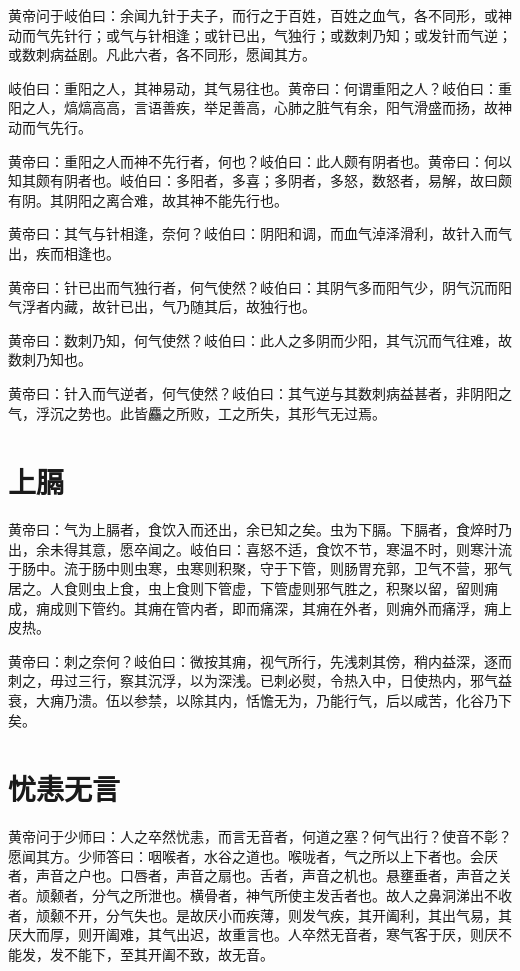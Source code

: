 \documentclass[a4paper,12pt,UTF8,twoside]{ctexbook}
\begin{document}
	黄帝问于岐伯曰：余闻九针于夫子，而行之于百姓，百姓之血气，各不同形，或神动而气先针行；或气与针相逢；或针已出，气独行；或数刺乃知；或发针而气逆；或数刺病益剧。凡此六者，各不同形，愿闻其方。
	
	岐伯曰：重阳之人，其神易动，其气易往也。黄帝曰：何谓重阳之人？岐伯曰：重阳之人，熇熇高高，言语善疾，举足善高，心肺之脏气有余，阳气滑盛而扬，故神动而气先行。
	
	黄帝曰：重阳之人而神不先行者，何也？岐伯曰：此人颇有阴者也。黄帝曰：何以知其颇有阴者也。岐伯曰：多阳者，多喜；多阴者，多怒，数怒者，易解，故曰颇有阴。其阴阳之离合难，故其神不能先行也。
	
	黄帝曰：其气与针相逢，奈何？岐伯曰：阴阳和调，而血气淖泽滑利，故针入而气出，疾而相逢也。
	
	黄帝曰：针已出而气独行者，何气使然？岐伯曰：其阴气多而阳气少，阴气沉而阳气浮者内藏，故针已出，气乃随其后，故独行也。
	
	黄帝曰：数刺乃知，何气使然？岐伯曰：此人之多阴而少阳，其气沉而气往难，故数刺乃知也。
	
	黄帝曰：针入而气逆者，何气使然？岐伯曰：其气逆与其数刺病益甚者，非阴阳之气，浮沉之势也。此皆麤之所败，工之所失，其形气无过焉。
	
	\chapter{上膈}
		
	黄帝曰：气为上膈者，食饮入而还出，余已知之矣。虫为下膈。下膈者，食焠时乃出，余未得其意，愿卒闻之。岐伯曰：喜怒不适，食饮不节，寒温不时，则寒汁流于肠中。流于肠中则虫寒，虫寒则积聚，守于下管，则肠胃充郭，卫气不营，邪气居之。人食则虫上食，虫上食则下管虚，下管虚则邪气胜之，积聚以留，留则痈成，痈成则下管约。其痈在管内者，即而痛深，其痈在外者，则痈外而痛浮，痈上皮热。
	
	黄帝曰：刺之奈何？岐伯曰：微按其痈，视气所行，先浅刺其傍，稍内益深，逐而刺之，毋过三行，察其沉浮，以为深浅。已刺必熨，令热入中，日使热内，邪气益衰，大痈乃溃。伍以参禁，以除其内，恬憺无为，乃能行气，后以咸苦，化谷乃下矣。
	
	\chapter{忧恚无言}
	
	黄帝问于少师曰：人之卒然忧恚，而言无音者，何道之塞？何气出行？使音不彰？愿闻其方。少师答曰：咽喉者，水谷之道也。喉咙者，气之所以上下者也。会厌者，声音之户也。口唇者，声音之扇也。舌者，声音之机也。悬壅垂者，声音之关者。颃颡者，分气之所泄也。横骨者，神气所使主发舌者也。故人之鼻洞涕出不收者，颃颡不开，分气失也。是故厌小而疾薄，则发气疾，其开阖利，其出气易，其厌大而厚，则开阖难，其气出迟，故重言也。人卒然无音者，寒气客于厌，则厌不能发，发不能下，至其开阖不致，故无音。
	
\end{document}
